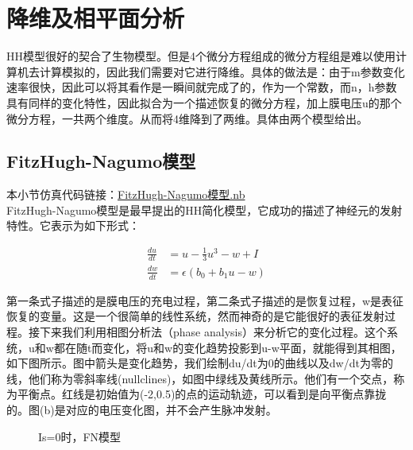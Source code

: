 \documentclass[12pt, a4paper, oneside]{ctexbook}
\begin{document}
\chapter{降维及相平面分析}

HH模型很好的契合了生物模型。但是4个微分方程组成的微分方程组是难以使用计算机去计算模拟的，因此我们需要对它进行降维。具体的做法是：由于m参数变化速率很快，因此可以将其看作是一瞬间就完成了的，作为一个常数，而n，h参数具有同样的变化特性，因此拟合为一个描述恢复的微分方程，加上膜电压u的那个微分方程，一共两个维度。从而将4维降到了两维。具体由两个模型给出。

\section{FitzHugh-Nagumo模型}
\textcolor[rgb]{1,0,0}{本小节仿真代码链接：\href{./降维到二维/FitzHugh-Nagumo模型.nb}{FitzHugh-Nagumo模型.nb}}\\
FitzHugh-Nagumo模型是最早提出的HH简化模型，它成功的描述了神经元的发射特性。它表示为如下形式：

\begin{equation}
    \begin{aligned}
        \frac{du}{dt}&=u-\frac{1}{3}u^3-w+I\\
        \frac{dw}{dt}&=\epsilon(b_0+b_1 u-w)
    \end{aligned}
\end{equation}

第一条式子描述的是膜电压的充电过程，第二条式子描述的是恢复过程，w是表征恢复的变量。这是一个很简单的线性系统，然而神奇的是它能很好的表征发射过程。接下来我们利用相图分析法（phase analysis）来分析它的变化过程。这个系统，u和w都在随t而变化，将u和w的变化趋势投影到u-w平面，就能得到其相图，如下图所示。图中箭头是变化趋势，我们绘制du/dt为0的曲线以及dw/dt为零的线，他们称为零斜率线(nullclines)，如图中绿线及黄线所示。他们有一个交点，称为平衡点。红线是初始值为(-2,0.5)的点的运动轨迹，可以看到是向平衡点靠拢的。图(b)是对应的电压变化图，并不会产生脉冲发射。

\begin{figure}[H]
    \centering
    \caption{Is=0时，FN模型}
\end{figure}
\end{document}
